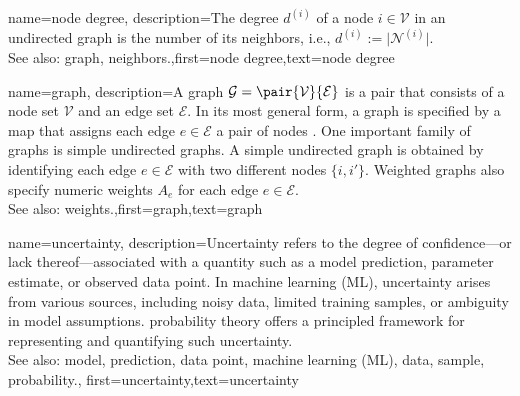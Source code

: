 {name={node degree},
	description={The degree $d^{(i)}$ of a node $i \in \mathcal{V}$ 
		in an undirected graph is the number of its neighbors, i.e., $d^{(i)} := \big|\mathcal{N}^{(i)}\big|$.
					\\ 
		See also: graph, neighbors.},first={node degree},text={node degree} 
}

{name={graph},
	description={A graph $\mathcal{G} = \pair{\mathcal{V}}{\mathcal{E}}$ is a pair that consists of 
		a node set $\mathcal{V}$ and an edge set $\mathcal{E}$. In its most general form, a graph is 
		specified by a map that assigns each edge $e \in \mathcal{E}$ a pair of nodes \cite{RockNetworks}. 
		One important family of graphs is simple undirected graphs. A simple undirected graph 
		is obtained by identifying each edge $e \in \mathcal{E}$ with two different nodes $\{i,i'\}$. 
		Weighted graphs also specify numeric weights $A_{e}$ for each 
		edge $e \in \mathcal{E}$.
					\\ 
		See also: weights.},first={graph},text={graph} 
}

{name={uncertainty},
	description={Uncertainty refers to the degree of confidence—or 
		lack thereof—associated with a quantity such as a model prediction, parameter estimate, or 
		observed data point. In machine learning (ML), uncertainty arises from various sources, including 
		noisy data, limited training samples, or ambiguity in model assumptions. \Gls{probability} theory 
		offers a principled framework for representing and quantifying such uncertainty.
					\\ 
		See also: model, prediction, data point, machine learning (ML), data, sample, probability.},
	first={uncertainty},text={uncertainty}
}

